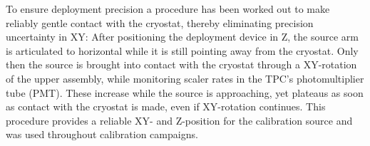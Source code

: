 To ensure deployment precision a procedure has been worked out to make reliably gentle contact with the cryostat, thereby eliminating precision uncertainty in XY: After positioning the deployment device in Z, the source arm is articulated to horizontal while it is still pointing away from the cryostat. Only then the source is brought into contact with the cryostat through a XY-rotation of the upper assembly, while monitoring scaler rates in the TPC's photomultiplier tube (PMT).  These increase while the source is approaching, yet plateaus as soon as contact with the cryostat is made, even if XY-rotation continues. This procedure provides a reliable XY- and Z-position for the calibration source and was used throughout calibration campaigns.